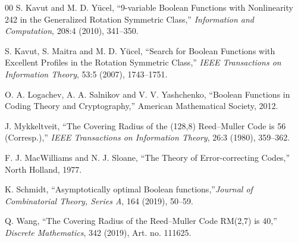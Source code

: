 \documentclass[11pt]{article}
\newtheorem{open problem}{Open problem}
\begin{document}
\begin{thebibliography}{00}
 S. Kavut and M. D. Y{\"u}cel,  ``9-variable Boolean Functions with Nonlinearity 242 in the Generalized Rotation Symmetric Class,'' \emph{Information and Computation}, 208:4 (2010), 341--350.

 S. Kavut, S. Maitra and M. D. Y{\"u}cel,  ``Search for Boolean Functions with Excellent Profiles in the Rotation Symmetric Class,'' \emph{IEEE Transactions on Information Theory}, 53:5 (2007), 1743--1751.

 O. A. Logachev, A. A. Salnikov and V. V. Yashchenko, ``Boolean Functions in Coding Theory and Cryptography,'' American Mathematical Society, 2012.

 J. Mykkeltveit,  ``The Covering Radius of the (128,8) Reed--Muller Code is 56 (Corresp.),'' \emph{IEEE Transactions on Information Theory}, 26:3 (1980), 359--362.

 F. J. MacWilliams and N. J. Sloane, ``The Theory of Error-correcting Codes,''
North Holland, 1977.

 K. Schmidt,  ``Asymptotically optimal Boolean functions,''\emph{Journal of Combinatorial Theory, Series A}, 164 (2019), 50--59.

 Q. Wang, ``The Covering Radius of the Reed--Muller Code RM(2,7) is 40,'' \emph{Discrete Mathematics}, 342 (2019), Art. no. 111625.
\end{thebibliography}
\end{document}
